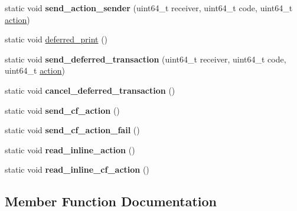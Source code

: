 \begin{DoxyCompactItemize}
\item 
\mbox{\label{structtest__transaction_a2396a272f97aee978e4afaeeaa853438}} 
static void {\bfseries send\+\_\+action\+\_\+sender} (uint64\+\_\+t receiver, uint64\+\_\+t code, uint64\+\_\+t \mbox{\hyperlink{structaacio_1_1action}{action}})
\item 
static void \mbox{\hyperlink{structtest__transaction_ab71bb5681c501f3ecd307cb8f8806816}{deferred\+\_\+print}} ()
\item 
\mbox{\label{structtest__transaction_a9ecd22ac57a37f65d2e77feeaa59ede0}} 
static void {\bfseries send\+\_\+deferred\+\_\+transaction} (uint64\+\_\+t receiver, uint64\+\_\+t code, uint64\+\_\+t \mbox{\hyperlink{structaacio_1_1action}{action}})
\item 
\mbox{\label{structtest__transaction_aa8071b6ba4e840a84c2f610e0c802fcf}} 
static void {\bfseries cancel\+\_\+deferred\+\_\+transaction} ()
\item 
\mbox{\label{structtest__transaction_a9b053ed0350cb192478f2a96ac5dec1f}} 
static void {\bfseries send\+\_\+cf\+\_\+action} ()
\item 
\mbox{\label{structtest__transaction_a885b4acf3fff5fb2484fe7848432f754}} 
static void {\bfseries send\+\_\+cf\+\_\+action\+\_\+fail} ()
\item 
\mbox{\label{structtest__transaction_a835515c28959c2dbb80037320430c83f}} 
static void {\bfseries read\+\_\+inline\+\_\+action} ()
\item 
\mbox{\label{structtest__transaction_a1785805574f389f7b3db2f37395525b1}} 
static void {\bfseries read\+\_\+inline\+\_\+cf\+\_\+action} ()
\end{DoxyCompactItemize}


\subsection{Member Function Documentation}
\mbox{\label{structtest__transaction_ab71bb5681c501f3ecd307cb8f8806816}} 
